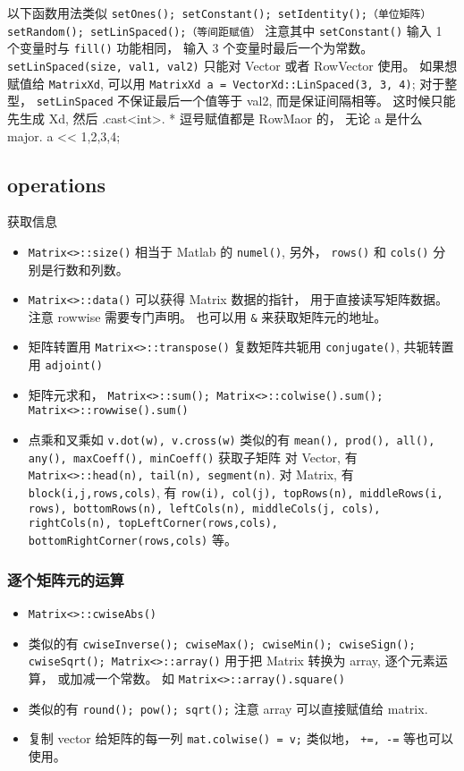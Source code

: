 以下函数用法类似
\verb|setOnes(); setConstant(); setIdentity();（单位矩阵） setRandom(); setLinSpaced();（等间距赋值）|
注意其中 \verb|setConstant()| 输入 1 个变量时与 \verb|fill()| 功能相同， 输入 3 个变量时最后一个为常数。 \verb|setLinSpaced(size, val1, val2)| 只能对 Vector 或者 RowVector 使用。 如果想赋值给 \verb|MatrixXd|, 可以用 \verb|MatrixXd a = VectorXd::LinSpaced(3, 3, 4)|; 对于整型， \verb|setLinSpaced| 不保证最后一个值等于 val2, 而是保证间隔相等。 这时候只能先生成 Xd, 然后 .cast<int>.
* 逗号赋值都是 RowMaor 的， 无论 a 是什么 major.
a << 1,2,3,4;

\subsection{operations}
获取信息
\begin{itemize}
\item \verb|Matrix<>::size()| 相当于 Matlab 的 \verb|numel()|, 另外， \verb|rows()| 和 \verb|cols()| 分别是行数和列数。
\item \verb|Matrix<>::data()| 可以获得 Matrix 数据的指针， 用于直接读写矩阵数据。 注意 rowwise 需要专门声明。 也可以用 \verb|&| 来获取矩阵元的地址。
\item 矩阵转置用 \verb|Matrix<>::transpose()| 复数矩阵共轭用 \verb|conjugate()|, 共轭转置用 \verb|adjoint()|
\item 矩阵元求和， \verb|Matrix<>::sum(); Matrix<>::colwise().sum(); Matrix<>::rowwise().sum()|
\item 点乘和叉乘如 \verb|v.dot(w), v.cross(w)|
类似的有 \verb|mean(), prod(), all(), any(), maxCoeff(), minCoeff()|
获取子矩阵
对 Vector, 有 \verb|Matrix<>::head(n), tail(n), segment(n)|. 对 Matrix, 有 \verb|block(i,j,rows,cols)|, 有 \verb|row(i), col(j), topRows(n), middleRows(i, rows), bottomRows(n), leftCols(n), middleCols(j, cols), rightCols(n), topLeftCorner(rows,cols), bottomRightCorner(rows,cols)| 等。
\end{itemize}


\subsubsection{逐个矩阵元的运算}
\begin{itemize}
\item \verb|Matrix<>::cwiseAbs()|
\item 类似的有 \verb|cwiseInverse(); cwiseMax(); cwiseMin(); cwiseSign(); cwiseSqrt(); Matrix<>::array()| 用于把 Matrix 转换为 array, 逐个元素运算， 或加减一个常数。 如 \verb|Matrix<>::array().square()|
\item 类似的有 \verb|round(); pow(); sqrt();| 注意 array 可以直接赋值给 matrix.
\item 复制 vector 给矩阵的每一列 \verb|mat.colwise() = v;| 类似地， \verb|+=, -=| 等也可以使用。
\end{itemize}


